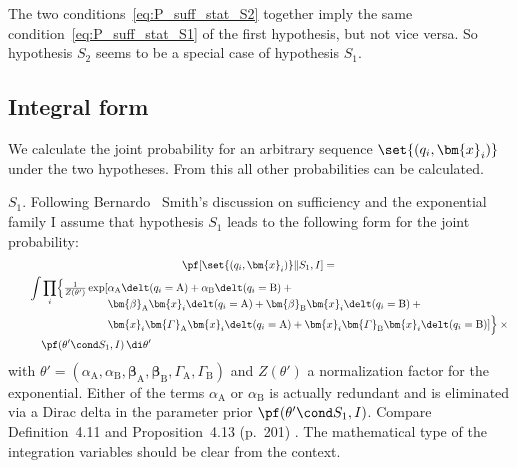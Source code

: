 \documentclass[10pt,%
onecolumn,oneside,a5paper,article,frenchb,italian,german,swedish,latin,british%
]{memoir}
\newcommand*{\yI}{I}
\newcommand*{\yS}{S}
\newcommand*{\yh}{q}
\newcommand*{\bx}{\bm{x}}
\newcommand*{\ya}{\textrm{A}}
\newcommand*{\yb}{\textrm{B}}
\newcommand*{\yla}{\alpha_{\ya}}
\newcommand*{\ylb}{\alpha_{\yb}}
\newcommand*{\yma}{\bm{\beta}_{\ya}}
\newcommand*{\ymb}{\bm{\beta}_{\yb}}
\newcommand*{\ymma}{\bm{\varGamma}_{\ya}}
\newcommand*{\ymmb}{\bm{\varGamma}_{\yb}}
\newcommand*{\yth}{\theta}
\begin{document}
The two conditions~\eqref{eq:P_suff_stat_S2} together imply the same
condition~\eqref{eq:P_suff_stat_S1} of the first hypothesis, but not vice
versa. So hypothesis $\yS_2$ seems to be a special case of hypothesis
$\yS_1$.

\subsection{Integral form}
\label{sec:integral_form}

We calculate the joint probability for an arbitrary sequence
$\set{(\yh_i,\bx_i)}$ under the two hypotheses. From this all other
  probabilities can be calculated.

\bigskip

$\yS_1$. Following Bernardo \amp\ Smith's discussion on sufficiency and the
exponential family \cite[\sect~4.5.3]{bernardoetal1994_r2000} I assume that
hypothesis $\yS_1$ leads to the following form for the joint probability:
\begin{multline}
  \label{eq:P_integral_exp_S1_initial}
  \pf[\set{(\yh_i,\bx_i)} \| \yS_1, \yI]
  ={}\\
  \qquad\!\begin{aligned}[b]
    \int&\prod_i\Bigl\{\tfrac{1}{Z(\yth')} \exp[\!\begin{aligned}[t]
      &\yla \delt(\yh_i=\ya) +\ylb \delt(\yh_i=\yb) + {}\\
      &\yma \bx_i\delt(\yh_i=\ya) +\ymb \bx_i\delt(\yh_i=\yb) +{}\\
      &\bx_i\ymma\bx_i \delt(\yh_i=\ya) +\bx_i\ymmb\bx_i \delt(\yh_i=\yb)
      ] \Bigr\}\times{}
    \end{aligned}\\
    &\pf(\yth' \cond \yS_1,\yI)\, \di\yth'
  \end{aligned}
\end{multline}
with $\yth'=(\yla,\ylb,\yma,\ymb,\ymma,\ymmb)$ and $Z(\yth')$ a
normalization factor for the exponential. Either of the terms $\yla$ or
$\ylb$ is actually redundant and is eliminated via a Dirac delta in the
parameter prior $\pf(\yth' \cond \yS_1,\yI)$. Compare Definition~4.11 and
Proposition~4.13 (p.~201) \cite[\sect~4.5.3]{bernardoetal1994_r2000}. The
mathematical type of the integration variables should be clear from the
context.
\end{document}
